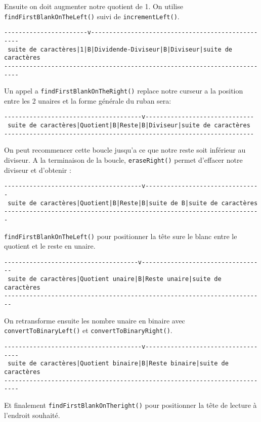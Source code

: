 \documentclass[a4paper,11pt]{article}
\begin{document}
Ensuite on doit augmenter notre quotient de 1. On utilise \texttt{findFirstBlankOnTheLeft()} suivi de \texttt{incrementLeft()}.
\begin{small}
\begin{verbatim}
-----------------------v--------------------------------------------------
 suite de caractères|1|B|Dividende-Diviseur|B|Diviseur|suite de caractères
--------------------------------------------------------------------------
\end{verbatim}
\end{small}
Un appel a \texttt{findFirstBlankOnTheRight()} replace notre curseur a la position entre les 2 unaires et la forme générale du ruban sera: 
\begin{small}
\begin{verbatim}
--------------------------------------v------------------------------
 suite de caractères|Quotient|B|Reste|B|Diviseur|suite de caractères
---------------------------------------------------------------------
\end{verbatim}
\end{small}
On peut recommencer cette boucle jusqu'a ce que notre reste soit inférieur au diviseur. A la terminaison de la boucle, \texttt{eraseRight()} permet d'effacer notre diviseur
et d'obtenir :
\begin{small}
\begin{verbatim}
--------------------------------------v--------------------------------
 suite de caractères|Quotient|B|Reste|B|suite de B|suite de caractères
-----------------------------------------------------------------------
\end{verbatim}
\end{small}
\texttt{findFirstBlankOnTheLeft()} pour positionner la tête sure le blanc entre le quotient et le reste en unaire.
\begin{small}
\begin{verbatim}
-------------------------------------v----------------------------------
 suite de caractères|Quotient unaire|B|Reste unaire|suite de caractères
------------------------------------------------------------------------
\end{verbatim}
\end{small}
On retransforme ensuite les nombre unaire en binaire avec \texttt{convertToBinaryLeft()} et \texttt{convertToBinaryRight()}.
\begin{small}
\begin{verbatim}
--------------------------------------v-----------------------------------
 suite de caractères|Quotient binaire|B|Reste binaire|suite de caractères
--------------------------------------------------------------------------
\end{verbatim}
\end{small}
Et finalement \texttt{findFirstBlankOnTheright()} pour positionner la tête de lecture à l'endroit souhaité.
\end{document}
